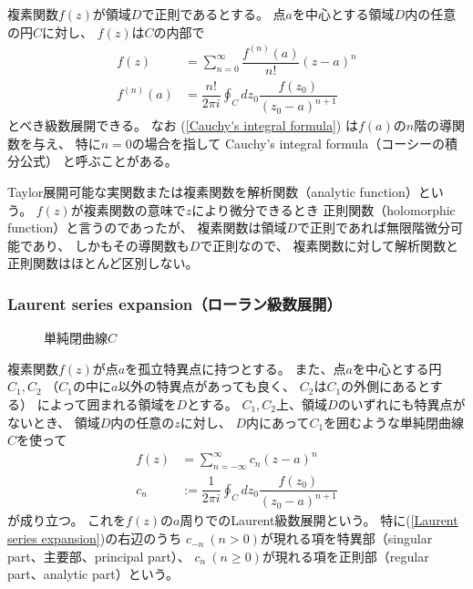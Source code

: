 複素関数$f(z)$が領域$D$で正則であるとする。
点$a$を中心とする領域$D$内の任意の円$C$に対し、
$f(z)$は$C$の内部で
\begin{subequations}
\begin{align}
    f(z)
    &=
    \sum_{n=0}^{\infty}
    \dfrac{f^{(n)}(a)}{n!}
    (z-a)^n
\\
    f^{(n)}(a)
    &=
    \dfrac{n!}{2 \pi i}
    \oint_C dz_0\dfrac{f(z_0)}{(z_0 - a)^{n+1}}
\label{Cauchy's integral formula}
\end{align}
\end{subequations}
とべき級数展開できる。
なお
(\ref{Cauchy's integral formula})
は$f(a)$の$n$階の導関数を与え、
特に$n=0$の場合を指して
Cauchy's integral formula（コーシーの積分公式）
と呼ぶことがある。

Taylor展開可能な実関数または複素関数を解析関数（analytic function）という。
$f(z)$が複素関数の意味で$z$により微分できるとき
正則関数（holomorphic function）と言うのであったが、
複素関数は領域$D$で正則であれば無限階微分可能であり、
しかもその導関数も$D$で正則なので、
複素関数に対して解析関数と正則関数はほとんど区別しない。

\subsubsection{Laurent series expansion（ローラン級数展開）}

\begin{wrapfigure}[7]{r}[5pt]{107pt}
  \centering
  
  \caption{単純閉曲線$C$}
\end{wrapfigure}
複素関数$f(z)$が点$a$を孤立特異点に持つとする。
また、点$a$を中心とする円$C_1, C_2$
（$C_1$の中に$a$以外の特異点があっても良く、
$C_2$は$C_1$の外側にあるとする）
によって囲まれる領域を$D$とする。
$C_1, C_2$上、領域$D$のいずれにも特異点がないとき、
領域$D$内の任意の$z$に対し、
$D$内にあって$C_1$を囲むような単純閉曲線$C$を使って
\begin{subequations}
\begin{align}
    f(z)
    &= \sum_{n=-\infty}^{\infty}
        c_n (z-a)^n
\label{Laurent series expansion}
\\
    c_n
    &:= \dfrac{1}{2 \pi i}
    \oint_C dz_0 \dfrac{f(z_0)}{(z_0 - a)^{n+1}}
\end{align}
\end{subequations}
が成り立つ。
これを$f(z)$の$a$周りでのLaurent級数展開という。
特に(\ref{Laurent series expansion})の右辺のうち
$c_{-n}\ (n > 0)$が現れる項を特異部（singular part、主要部、principal part）、
$c_{n}\ (n \ge 0)$が現れる項を正則部（regular part、analytic part）という。

